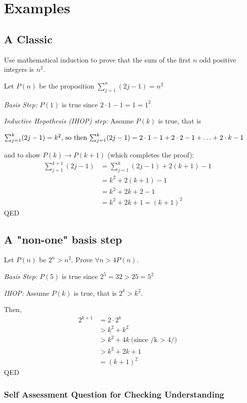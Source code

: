 \documentclass[12pt]{amsart}
\begin{document}
\section{Examples}
\subsection{A Classic}

Use mathematical induction to prove that the sum
of the first $n$ odd positive integers is $n^2$.

Let $P(n)$ be the proposition $\sum_{j=1}^n (2j - 1) = n^2$

\textit{Basis Step:} $P(1)$ is true since $2 \cdot 1 - 1 = 1 = 1^2$

\textit{Inductive Hopothesis (IHOP) step:} Assume $P(k)$ is true, that is

$\sum_{j=1}^k (2j - 1) = k^2,\) so then \(\sum_{j=1}^{k}(2j - 1) =
2 \cdot 1 - 1 + 2 \cdot 2 - 1 + \ldots + 2 \cdot k - 1$

and to show $P(k) \rightarrow P(k + 1)$ (which completes the proof):
\begin{align}
\sum_{j=1}^{k + 1}(2j - 1)&=\sum_{j=1}^k(2j - 1) + 2(k + 1) - 1\\
&= k^2 + 2(k + 1) - 1\\
&= k^2 + 2k + 2 - 1\\
&= k^2 + 2k + 1 = (k + 1)^2
\end{align}
QED

\subsection{A "non-one" basis step}

Let $P(n)$ be $2^n > n^2$. Prove $\forall n>4 P(n)$.

\textit{Basis Step:} $P(5)$ is true since $2^5 = 32 > 25 = 5^2$

\textit{IHOP:} Assume $P(k)$ is true, that is $2^k > k^2$.

Then,
\begin{align}
 2^{k+1} &= 2 \cdot 2^k\\
         &> k^2 + k^2\\
         &> k^2 + 4k\ \mbox{(since /k > 4/)}\\
         &> k^2 + 2k + 1\\
         &= (k + 1)^2
 \end{align}
QED

\subsubsection{Self Assessment Question for Checking Understanding} 
\end{document}
